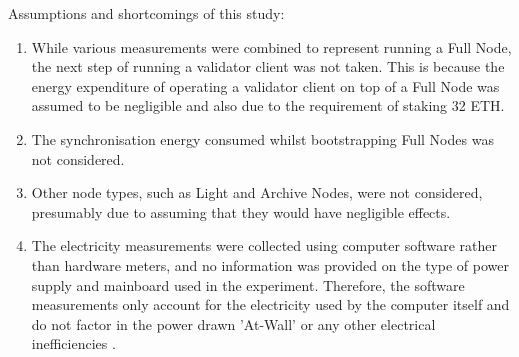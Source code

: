 Assumptions and shortcomings of this study:
\begin{enumerate}
    \item While various measurements were combined to represent running a Full Node, the next step of running a validator client was not taken. This is because the energy expenditure of operating a validator client on top of a Full Node was assumed to be negligible and also due to the requirement of staking 32 ETH.
    
    \item The synchronisation energy consumed whilst bootstrapping Full Nodes was not considered.
    
    \item Other node types, such as Light and Archive Nodes, were not considered, presumably due to assuming that they would have negligible effects.

    \item The electricity measurements were collected using computer software rather than hardware meters, and no information was provided on the type of power supply and mainboard used in the experiment. Therefore, the software measurements only account for the electricity used by the computer itself and do not factor in the power drawn 'At-Wall' or any other electrical inefficiencies \cite{Warkozek2012ACenters}.
\end{enumerate}
 






